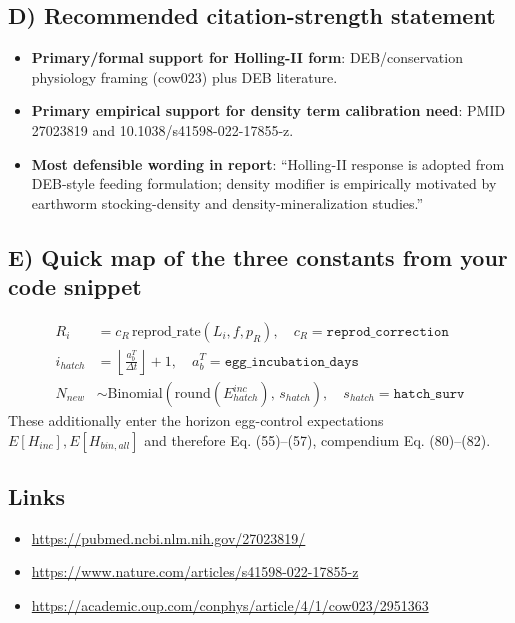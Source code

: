 \documentclass[11pt]{article}
\begin{document}
\subsection*{D) Recommended citation-strength statement}
\begin{itemize}
\item \textbf{Primary/formal support for Holling-II form}: DEB/conservation physiology framing (cow023) plus DEB literature.
\item \textbf{Primary empirical support for density term calibration need}: PMID 27023819 and 10.1038/s41598-022-17855-z.
\item \textbf{Most defensible wording in report}: ``Holling-II response is adopted from DEB-style feeding formulation; density modifier is empirically motivated by earthworm stocking-density and density-mineralization studies.''
\end{itemize}

\subsection*{E) Quick map of the three constants from your code snippet}
\begin{align}
R_i &= c_R\,\mathrm{reprod\_rate}(L_i,f,p_R), \quad c_R=\texttt{reprod\_correction} \tag{69}\\
i_{hatch} &= \left\lfloor \frac{a_b^T}{\Delta t}\right\rfloor+1, \quad a_b^T=\texttt{egg\_incubation\_days} \tag{28}\\
N_{new} &\sim \mathrm{Binomial}\!\left(\mathrm{round}(E_{hatch}^{inc}),\,s_{hatch}\right), \quad s_{hatch}=\texttt{hatch\_surv} \tag{29}
\end{align}
These additionally enter the horizon egg-control expectations \(E[H_{inc}],E[H_{bin,all}]\) and therefore Eq. (55)--(57), compendium Eq. (80)--(82).

\subsection*{Links}
\begin{itemize}
\item \url{https://pubmed.ncbi.nlm.nih.gov/27023819/}
\item \url{https://www.nature.com/articles/s41598-022-17855-z}
\item \url{https://academic.oup.com/conphys/article/4/1/cow023/2951363}
\end{itemize}
\end{document}
